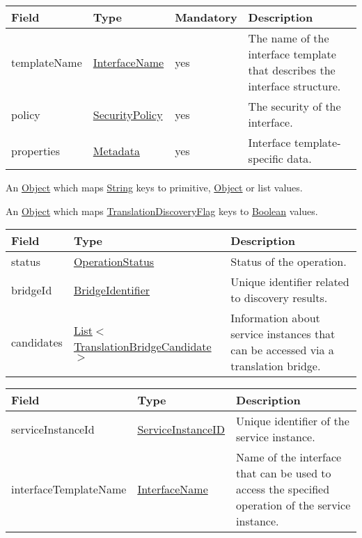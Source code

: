 \documentclass[a4paper]{arrowhead}
\newcommand{\pref}[1]{{\textcolor{ArrowheadGrey}{\hyperref[sec:model:primitives:#1]{#1}}}}
\begin{document}
\begin{table}[ht!]
\begin{tabularx}{\textwidth}{| p{3.9cm} | p{4cm} | p{2cm} | X |} \hline
\rowcolor{gray!33} Field & Type & Mandatory & Description \\ \hline
templateName & \pref{InterfaceName} & yes & The name of the interface template that describes the interface structure. \\ \hline
policy & \pref{SecurityPolicy} & yes & The security of the interface. \\ \hline
properties &\hyperref[sec:model:Metadata]{Metadata} & yes & Interface template-specific data. \\ \hline
\end{tabularx}
\end{table}


An \pref{Object} which maps \pref{String} keys to primitive, \pref{Object} or list values.


An \pref{Object} which maps \pref{TranslationDiscoveryFlag} keys to \pref{Boolean} values.

\clearpage


\begin{table}[ht!]
\begin{tabularx}{\textwidth}{| p{4.25cm} | p{6.1cm} | X |} \hline
\rowcolor{gray!33} Field & Type      & Description \\ \hline
status & \pref{OperationStatus} & Status of the operation. \\ \hline
bridgeId & \pref{BridgeIdentifier} & Unique identifier related to discovery results. \\ \hline
candidates & \pref{List}$<$\hyperref[sec:model:TranslationBridgeCandidate]{TranslationBridgeCandidate}$>$ & Information about service instances that can be accessed via a translation bridge. \\ \hline
\end{tabularx}
\end{table}


\begin{table}[ht!]
\begin{tabularx}{\textwidth}{| p{4.25cm} | p{6.1cm} | X |} \hline
\rowcolor{gray!33} Field & Type      & Description \\ \hline
serviceInstanceId & \pref{ServiceInstanceID} & Unique identifier of the service ins\-tance. \\ \hline
interfaceTemplateName & \pref{InterfaceName} & Name of the interface that can be used to access the specified operation of the service instance. \\ \hline
\end{tabularx}
\end{table}
\end{document}
